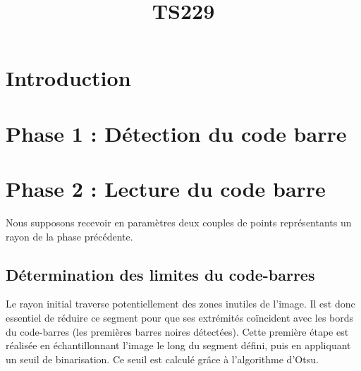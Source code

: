 \documentclass{rapport}
\title{TS229}
\begin{document}

\fairemarges %
\fairepagedegarde %
\newpage
\tabledematieres %
\newpage

\section{Introduction}

\section {Phase 1 : Détection du code barre}

\section{Phase 2 : Lecture du code barre}

Nous supposons recevoir en paramètres deux couples de points représentants un rayon de la phase précédente. 

\subsection{Détermination des limites du code-barres}

Le rayon initial traverse potentiellement des zones inutiles de l'image. Il est donc essentiel de réduire ce segment pour que ses extrémités coïncident avec les bords du code-barres (les premières barres noires détectées).  
Cette première étape est réalisée en échantillonnant l’image le long du segment défini, puis en appliquant un seuil de binarisation. Ce seuil est calculé grâce à l’algorithme d’Otsu.  
\end{document}
